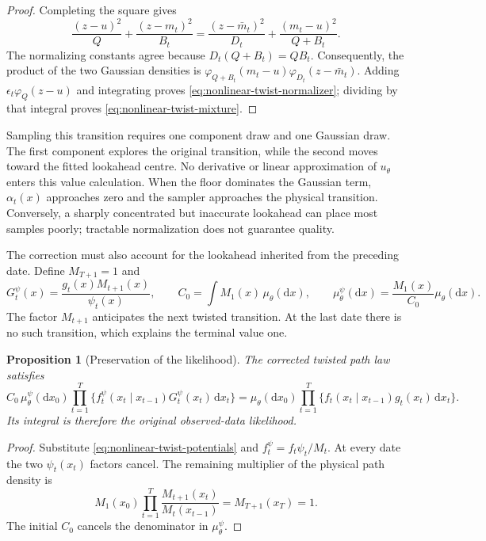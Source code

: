 \documentclass[11pt]{article}
\newtheorem{proposition}{Proposition}
\newcommand{\dd}{\mathrm{d}}
\begin{document}
\begin{proof}
Completing the square gives
\[
 \frac{(z-u)^2}{Q}+\frac{(z-m_t)^2}{B_t}
 =\frac{(z-\bar m_t)^2}{D_t}
   +\frac{(m_t-u)^2}{Q+B_t}.
\]
The normalizing constants agree because $D_t(Q+B_t)=QB_t$.
Consequently, the product of the two Gaussian densities is
$\varphi_{Q+B_t}(m_t-u)\varphi_{D_t}(z-\bar m_t)$.
Adding $\epsilon_t\varphi_Q(z-u)$ and integrating proves
\eqref{eq:nonlinear-twist-normalizer}; dividing by that integral proves
\eqref{eq:nonlinear-twist-mixture}.
\end{proof}

Sampling this transition requires one component draw and one Gaussian draw.
The first component explores the original transition, while the second moves
toward the fitted lookahead centre. No derivative or linear approximation of
$u_\theta$ enters this value calculation. When the floor dominates the Gaussian
term, $\alpha_t(x)$ approaches zero and the sampler approaches the physical
transition. Conversely, a sharply concentrated but inaccurate lookahead can
place most samples poorly; tractable normalization does not guarantee quality.

The correction must also account for the lookahead inherited from the preceding
date. Define $M_{T+1}=1$ and
\begin{equation}
 G_t^\psi(x)=\frac{g_t(x)M_{t+1}(x)}{\psi_t(x)},\qquad
 C_0=\int M_1(x)\,\mu_\theta(\dd x),\qquad
 \mu_\theta^\psi(\dd x)=\frac{M_1(x)}{C_0}\mu_\theta(\dd x).
 \label{eq:nonlinear-twist-potentials}
\end{equation}
The factor $M_{t+1}$ anticipates the next twisted transition. At the last date
there is no such transition, which explains the terminal value one.

\begin{proposition}[Preservation of the likelihood]
\label{prop:nonlinear-twist-cancellation}
The corrected twisted path law satisfies
\begin{equation}
 C_0\,\mu_\theta^\psi(\dd x_0)
 \prod_{t=1}^T\{f_t^\psi(x_t\mid x_{t-1})G_t^\psi(x_t)\,\dd x_t\}
 =\mu_\theta(\dd x_0)
 \prod_{t=1}^T\{f_t(x_t\mid x_{t-1})g_t(x_t)\,\dd x_t\}.
 \label{eq:nonlinear-twist-path-identity}
\end{equation}
Its integral is therefore the original observed-data likelihood.
\end{proposition}

\begin{proof}
Substitute \eqref{eq:nonlinear-twist-potentials} and
$f_t^\psi=f_t\psi_t/M_t$. At every date the two $\psi_t(x_t)$ factors
cancel. The remaining multiplier of the physical path density is
\[
 M_1(x_0)\prod_{t=1}^T
       \frac{M_{t+1}(x_t)}{M_t(x_{t-1})}=M_{T+1}(x_T)=1.
\]
The initial $C_0$ cancels the denominator in $\mu_\theta^\psi$.
\end{proof}
\end{document}
